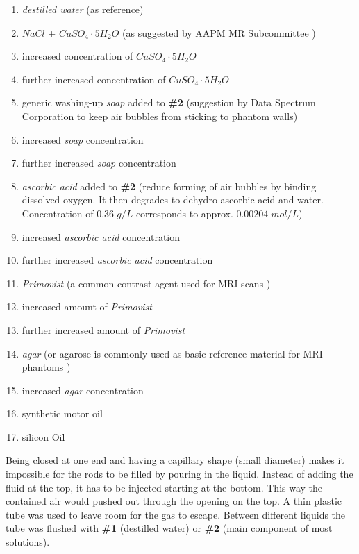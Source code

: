 \documentclass[parskip,bibtotoc,final,twoside=false,titlepage,a4paper,english,12pt,titlepage,a4paper]{scrbook}
\begin{document}
\newpage
\begin{enumerate}[label=\textbf{\#\arabic*}]
 \item \textit{destilled water} (as reference)
 \item $NaCl$ + $CuSO_4\cdot5H_2O$ (as suggested by AAPM MR Subcommittee \cite{Jackson2009})
 \item increased concentration of $CuSO_4\cdot5H_2O$
 \item further increased concentration of $CuSO_4\cdot5H_2O$
 \item generic washing-up \textit{soap} added to \textbf{\#2} (suggestion by Data Spectrum Corporation \cite{bubbles} to keep air bubbles from sticking to phantom walls)
 \item increased \textit{soap} concentration
 \item further increased \textit{soap} concentration
 \item \textit{ascorbic acid} added to \textbf{\#2} (reduce forming of air bubbles by binding dissolved oxygen. It then degrades to dehydro-ascorbic acid and water.
  \cite{Abtahi2008, Bodannes1979} Concentration of $0.36 \; g/L$ corresponds to approx. $0.00204 \; mol/L$)
 \item increased \textit{ascorbic acid} concentration
 \item further increased \textit{ascorbic acid} concentration
 \item \textit{Primovist} (a common contrast agent used for MRI scans \cite{VanBeers2012, Rohrer, primovist})
 \item increased amount of \textit{Primovist}
 \item further increased amount of \textit{Primovist}
 \item \textit{agar} (or agarose is commonly used as basic reference material for MRI phantoms \cite{BuccioliniCiraolo1989, Mathur-DeVre1985})
 \item increased \textit{agar} concentration
 \item synthetic motor oil
 \item silicon Oil
\end{enumerate}


Being closed at one end and having a capillary shape (small diameter) makes it impossible for the rods to be filled by pouring in the liquid.
Instead of adding the fluid at the top, it has to be injected starting at the bottom.
This way the contained air would pushed out through the opening on the top.
A thin plastic tube was used to leave room for the gas to escape.
Between different liquids the tube was flushed with \textbf{\#1} (destilled water) or \textbf{\#2} (main component of most solutions).
\end{document}
